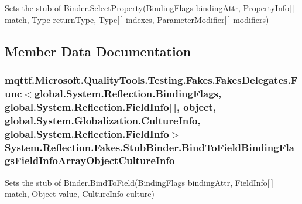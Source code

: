 Sets the stub of Binder.\-Select\-Property(\-Binding\-Flags binding\-Attr, Property\-Info\mbox{[}$\,$\mbox{]} match, Type return\-Type, Type\mbox{[}$\,$\mbox{]} indexes, Parameter\-Modifier\mbox{[}$\,$\mbox{]} modifiers)



\subsection{Member Data Documentation}
\hypertarget{class_system_1_1_reflection_1_1_fakes_1_1_stub_binder_a82e7d55dc654826b909ad50208bfda0d}{
\subsubsection[{Bind\-To\-Field\-Binding\-Flags\-Field\-Info\-Array\-Object\-Culture\-Info}]{\setlength{\rightskip}{0pt plus 5cm}mqttf.\-Microsoft.\-Quality\-Tools.\-Testing.\-Fakes.\-Fakes\-Delegates.\-Func$<$global.\-System.\-Reflection.\-Binding\-Flags, global.\-System.\-Reflection.\-Field\-Info\mbox{[}$\,$\mbox{]}, object, global.\-System.\-Globalization.\-Culture\-Info, global.\-System.\-Reflection.\-Field\-Info$>$ System.\-Reflection.\-Fakes.\-Stub\-Binder.\-Bind\-To\-Field\-Binding\-Flags\-Field\-Info\-Array\-Object\-Culture\-Info}}\label{class_system_1_1_reflection_1_1_fakes_1_1_stub_binder_a82e7d55dc654826b909ad50208bfda0d}


Sets the stub of Binder.\-Bind\-To\-Field(\-Binding\-Flags binding\-Attr, Field\-Info\mbox{[}$\,$\mbox{]} match, Object value, Culture\-Info culture)

